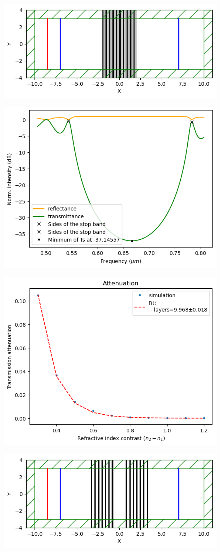 \begin{figure}[H]
    \centering
    \includegraphics[width=0.8\linewidth]{Figures/bragg_design.png}
    \caption{}
    \label{fig:bragg_design}
\end{figure}

\begin{figure}[H]
    \centering
    \includegraphics[width=0.6\linewidth]{Figures/bragg_spectrum.png}
    \caption{}
    \label{fig:bragg_spectrum}
\end{figure}

\begin{figure}[H]
    \centering
    \includegraphics[width=0.6\linewidth]{Figures/bragg_attenuation_vs_index.png}
    \caption{}
    \label{fig:bragg_attenuation_vs_index}
\end{figure}

\begin{figure}[H]
    \centering
    \includegraphics[width=0.8\linewidth]{Figures/bragg_cavity_design.png}
    \caption{}
    \label{fig:bragg_cavity_design}
\end{figure}

